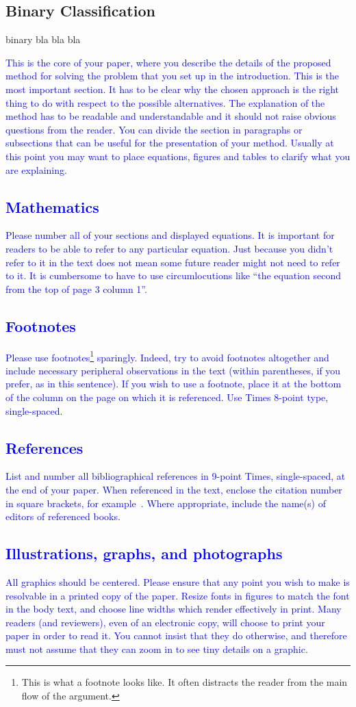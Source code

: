 \documentclass[10pt,twocolumn,letterpaper]{article}
\begin{document}
   \subsection{Binary Classification}
   binary bla bla bla



\textcolor{blue}{
This is the core of your paper, where you describe the details of the proposed method for solving the problem that you set up in the introduction. This is the most important section. It has to be clear why the chosen approach is the right thing to do with respect to the possible alternatives. The explanation of the method has to be readable and understandable and it should not raise obvious questions from the reader. 
You can divide the section in paragraphs or subsections that can be useful for the presentation of your method. Usually at this point you may want to place equations, figures and tables to clarify what you are explaining.
\subsection{Mathematics}
Please number all of your sections and displayed equations.  It is
important for readers to be able to refer to any particular equation.  Just
because you didn't refer to it in the text does not mean some future reader
might not need to refer to it.  It is cumbersome to have to use
circumlocutions like ``the equation second from the top of page 3 column
1''. 
\subsection{Footnotes}
Please use footnotes\footnote {This is what a footnote looks like.  It
often distracts the reader from the main flow of the argument.} sparingly.
Indeed, try to avoid footnotes altogether and include necessary peripheral
observations in
the text (within parentheses, if you prefer, as in this sentence).  If you
wish to use a footnote, place it at the bottom of the column on the page on
which it is referenced. Use Times 8-point type, single-spaced.
\subsection{References}
List and number all bibliographical references in 9-point Times,
single-spaced, at the end of your paper. When referenced in the text,
enclose the citation number in square brackets, for
example~\cite{Authors14}.  Where appropriate, include the name(s) of
editors of referenced books.
\subsection{Illustrations, graphs, and photographs}
All graphics should be centered.  Please ensure that any point you wish to
make is resolvable in a printed copy of the paper.  Resize fonts in figures
to match the font in the body text, and choose line widths which render
effectively in print.  Many readers (and reviewers), even of an electronic
copy, will choose to print your paper in order to read it.  You cannot
insist that they do otherwise, and therefore must not assume that they can
zoom in to see tiny details on a graphic.}
\end{document}
